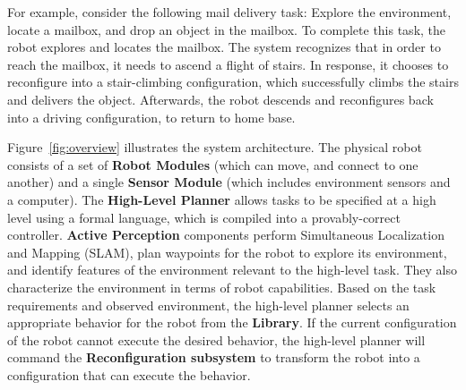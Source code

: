 \documentclass[journal]{IEEEtran}
\begin{document}
For example, consider the following mail delivery task: Explore the environment, locate a mailbox, and drop an object in the mailbox.  To complete this task, the robot explores and locates the mailbox. The system recognizes that in order to reach the mailbox, it needs to ascend a flight of stairs. In response, it chooses to reconfigure into a stair-climbing configuration, which successfully climbs the stairs and delivers the object.  Afterwards, the robot descends and reconfigures back into a driving configuration, to return to home base.

Figure~\ref{fig:overview} illustrates the system architecture.
The physical robot consists of a set of \textbf{Robot Modules} (which can move, and connect to one another) and a single \textbf{Sensor Module} (which includes environment sensors and a computer).
The \textbf{High-Level Planner} allows tasks to be specified at a high level using a formal language, which is compiled into a provably-correct controller.
\textbf{Active Perception} components perform Simultaneous Localization and Mapping (SLAM), plan waypoints for the robot to explore its environment, and identify features of the environment relevant to the high-level task. They also characterize the environment in terms of robot capabilities.
Based on the task requirements and observed environment, the high-level planner selects an appropriate behavior for the robot from the \textbf{Library}.
If the current configuration of the robot cannot execute the desired behavior, the high-level planner will command the \textbf{Reconfiguration subsystem} to transform the robot into a configuration that can execute the behavior.
\end{document}
